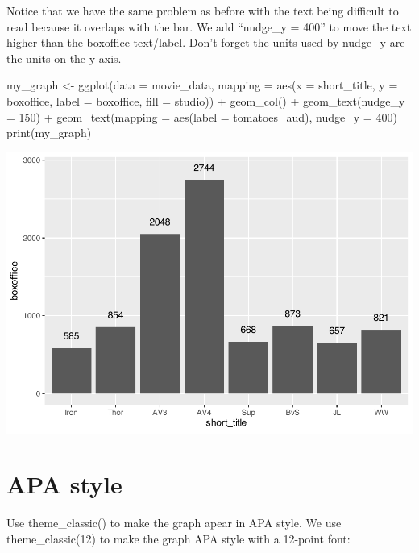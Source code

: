 \documentclass[
]{krantz}
\makeatletter
\newenvironment{Shaded}{\begin{snugshade}}{\end{snugshade}}
\newcommand{\AttributeTok}[1]{\textcolor[rgb]{0.61,0.61,0.61}{#1}}
\newcommand{\DecValTok}[1]{\textcolor[rgb]{0.06,0.06,0.06}{#1}}
\newcommand{\FunctionTok}[1]{\textcolor[rgb]{0,0,0}{#1}}
\newcommand{\NormalTok}[1]{#1}
\newcommand{\OtherTok}[1]{\textcolor[rgb]{0.37,0.37,0.37}{#1}}
\newcommand{\SpecialCharTok}[1]{\textcolor[rgb]{0,0,0}{#1}}
\newenvironment{kframe}{%
\medskip{}
\setlength{\fboxsep}{.8em}
 \def\at@end@of@kframe{}%
 \ifinner\ifhmode%
  \def\at@end@of@kframe{\end{minipage}}%
  \begin{minipage}{\columnwidth}%
 \fi\fi%
 \def\FrameCommand##1{\hskip\@totalleftmargin \hskip-\fboxsep
 \colorbox{shadecolor}{##1}\hskip-\fboxsep
     \hskip-\linewidth \hskip-\@totalleftmargin \hskip\columnwidth}%
 \MakeFramed {\advance\hsize-\width
   \@totalleftmargin\z@ \linewidth\hsize
   \@setminipage}}%
 {\par\unskip\endMakeFramed%
 \at@end@of@kframe}
\renewenvironment{Shaded}{\begin{kframe}}{\end{kframe}}
\makeatother
\begin{document}
Notice that we have the same problem as before with the text being difficult to read because it overlaps with the bar. We add ``nudge\_y = 400'' to move the text higher than the boxoffice text/label. Don't forget the units used by nudge\_y are the units on the y-axis.

\begin{Shaded}
\begin{Highlighting}[]
\NormalTok{my\_graph }\OtherTok{\textless{}{-}} \FunctionTok{ggplot}\NormalTok{(}\AttributeTok{data =}\NormalTok{ movie\_data,}
           \AttributeTok{mapping =} \FunctionTok{aes}\NormalTok{(}\AttributeTok{x =}\NormalTok{ short\_title,}
                         \AttributeTok{y =}\NormalTok{ boxoffice,}
                         \AttributeTok{label =}\NormalTok{ boxoffice, }
                         \AttributeTok{fill =}\NormalTok{ studio)) }\SpecialCharTok{+}
  \FunctionTok{geom\_col}\NormalTok{() }\SpecialCharTok{+}
  \FunctionTok{geom\_text}\NormalTok{(}\AttributeTok{nudge\_y =} \DecValTok{150}\NormalTok{)  }\SpecialCharTok{+}
  \FunctionTok{geom\_text}\NormalTok{(}\AttributeTok{mapping =} \FunctionTok{aes}\NormalTok{(}\AttributeTok{label =}\NormalTok{ tomatoes\_aud), }
            \AttributeTok{nudge\_y =} \DecValTok{400}\NormalTok{) }
\FunctionTok{print}\NormalTok{(my\_graph)}
\end{Highlighting}
\end{Shaded}

\includegraphics[width=0.65\linewidth]{bookdown_files/figure-latex/unnamed-chunk-112-1}

\newpage

\hypertarget{apa-style}{%
\section{APA style}\label{apa-style}}

Use theme\_classic() to make the graph apear in APA style. We use theme\_classic(12) to make the graph APA style with a 12-point font:
\end{document}
